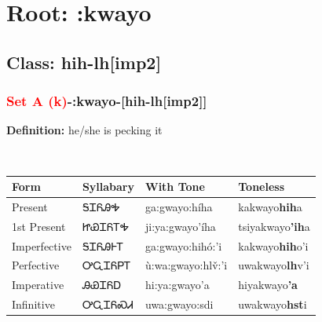 \needspace{4in}
\section*{Root: :kwayo}
\nopagebreak
{}
\needspace{3in}
\subsection*{Class: hih-lh[imp2]}
\nopagebreak
\needspace{2in}
\subsubsection*{\textcolor{Red}{Set A (k)}{-}\textbf{:kwayo}{-}[hih-lh[imp2]]}
\nopagebreak
\textbf{Definition: } he/she is pecking it
\\[0.5em]
\begin{tabularx}{\textwidth}{l X X X}%
\toprule%
\textbf{Form}&\textbf{Syllabary}&\textbf{With Tone}&\textbf{Toneless}\\%
\midrule%
Present&ᎦᏆᏲᎯᎭ&ga:gwayo:híha&kakwayo\textbf{hih}a\\%
1st Present&ᏥᏯᏆᏲᎢᎭ&ji:ya:gwayo’íha&tsiyakwayo\textbf{'ih}a\\%
Imperfective&ᎦᏆᏲᎯᎰᎢ&ga:gwayo:hihó:’i&kakwayo\textbf{hih}o'i\\%
Perfective&ᎤᏩᏆᏲᏢᎢ&ù:wa:gwayo:hlv̌:’i&uwakwayo\textbf{lh}v'i\\%
Imperative&ᎯᏯᏆᏲᎠ&hi:ya:gwayo’a&hiyakwayo\textbf{'a}\\%
Infinitive&ᎤᏩᏆᏲᏍᏗ&uwa:gwayo:sdi&uwakwayo\textbf{hst}i\\%
\bottomrule%
\end{tabularx}
\\[1em]